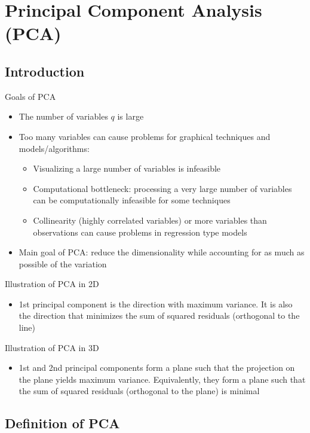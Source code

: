 \documentclass[a4paper]{article}
\begin{document}
\section{Principal Component Analysis (PCA)}

\subsection{Introduction}

Goals of PCA
\begin{itemize}
    \item The number of variables $q$ is large
    \item Too many variables can cause problems for graphical techniques and models/algorithms:
    \begin{itemize}
        \item Visualizing a large number of variables is infeasible
        \item Computational bottleneck: processing a very large number of variables can be computationally infeasible for some techniques
        \item Collinearity (highly correlated variables) or more variables than observations can cause problems in regression type models
    \end{itemize}
    \item Main goal of PCA: reduce the dimensionality while accounting for as much as possible of the variation
\end{itemize}

Illustration of PCA in 2D
\begin{itemize}
    \item 1st principal component is the direction with maximum variance. It is also the direction that minimizes the sum of squared residuals (orthogonal to the line)
\end{itemize}

Illustration of PCA in 3D
\begin{itemize}
    \item 1st and 2nd principal components form a plane such that the projection on the plane yields maximum variance. Equivalently, they form a plane such that the sum of squared residuals (orthogonal to the plane) is minimal
\end{itemize}

\subsection{Definition of PCA}
\end{document}
